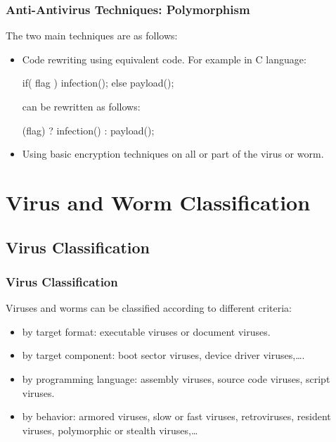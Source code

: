\documentclass{beamer}
\begin{document}
\begin{frame}
\frametitle{Anti-Antivirus Techniques: Polymorphism}

The two main techniques are as follows:


\begin{itemize}
\item Code rewriting using equivalent code. For example in C language:
\begin{flushleft}
\begin{tt}
if( flag ) infection();
else payload();
\end{tt}
\end{flushleft}
can be rewritten as follows:
\begin{flushleft}
\begin{tt}
(flag) ? infection() : payload();
\end{tt}
\end{flushleft}
\medskip

\item Using basic encryption techniques on all or part of the virus or worm. %


\end{itemize}
\end{frame}



\section{Virus and Worm Classification}


\subsection{Virus Classification}
\begin{frame}
\frametitle{Virus Classification}
Viruses and worms can be classified according to different criteria:
\begin{itemize}
\item by target format: {\color{blue} executable} viruses or {\color{blue} document} viruses.
\item by target component: {\color{blue} boot sector viruses, device driver} viruses,\ldots.
\item by programming language: assembly viruses, source code viruses, script viruses.
\item by behavior: armored viruses, slow or fast viruses, retroviruses, resident viruses, polymorphic or stealth viruses,\ldots
\end{itemize}
\end{frame}
\end{document}

